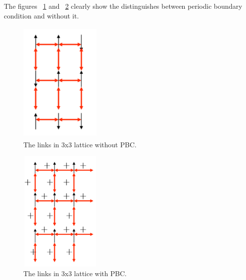 \documentclass[]{article}
\begin{document}
The figures ~\ref{fig:No_PBC} and ~\ref{fig:PBC} clearly show the distinguishes between periodic boundary condition and without it. 
\begin{figure}[H]
  \centering
  \includegraphics[width=4cm,height=6cm]{figures/NoPBC_ls}
  \caption{\label{fig:No_PBC} The links in 3x3 lattice without PBC.}
\end{figure}

\begin{figure}[H]
  \centering
  \includegraphics[width=4cm,height=6cm]{figures/PBC_ls}
  \caption{\label{fig:PBC} The links in 3x3 lattice with PBC.}
\end{figure}
\end{document}
